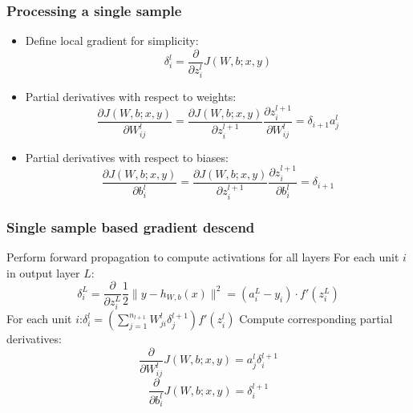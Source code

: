 \documentclass{beamer}
\begin{document}
\begin{CJK*}{UTF8}{gbsn}
\begin{frame}\frametitle{Processing a single sample}
\begin{itemize}
\item Define local gradient for simplicity:
\begin{equation}
\delta_i^l=\frac{\partial}{\partial z_i^{l}}J(W,b;x,y)
\end{equation}
\item Partial derivatives with respect to weights:
\begin{equation}
\frac{\partial J(W,b;x,y)}{\partial W_{ij}^l}=\frac{\partial J(W,b;x,y)}{\partial z_i^{l+1}}\frac{\partial z_i^{l+1}}{\partial W_{ij}^l}=\delta_{i+1}a_j^l
\end{equation}
\item Partial derivatives with respect to biases:
\begin{equation}
\frac{\partial J(W,b;x,y)}{\partial b_{i}^l}=\frac{\partial J(W,b;x,y)}{\partial z_i^{l+1}}\frac{\partial z_i^{l+1}}{\partial b_{i}^l}=\delta_{i+1}
\end{equation}
\end{itemize}
\end{frame}

\begin{frame}\frametitle{Single sample based gradient descend}
\begin{algorithm}[H]
Perform forward propagation to compute activations for all layers\;
For each unit $i$ in output layer $L$:
\begin{equation}
\delta_i^{L}=\frac{\partial}{\partial z_i^{L}}\frac{1}{2}\|y-h_{W,b}(x)\|^2=(a_i^{L}-y_i)\cdot f'(z_i^{L})
\end{equation}
{
    For each unit $i$:$\delta_i^l=(\sum_{j=1}^{n_{l+1}}W_{ji}^l\delta_j^{l+1})f'(z_i^l)$\;
}
Compute corresponding partial derivatives:
\begin{equation}
\frac{\partial}{\partial W_{ij}^l}J(W,b;x,y)=a_j^l\delta_i^{l+1}
\end{equation}
\begin{equation}
\frac{\partial}{\partial b_{i}^l}J(W,b;x,y)=\delta_i^{l+1}
\end{equation}
\end{algorithm}
\end{frame}


\end{CJK*}
\end{document}
